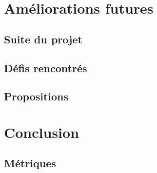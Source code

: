 \documentclass{EPL-master-thesis-covers-FR}
\begin{document}
		

	\chapter{Améliorations futures}


		\section{Suite du projet}
			\label{ref:suite_projet}

		

		\section{Défis rencontrés}

			

		\section{Propositions}

			
	\chapter{Conclusion}

		

		\section{Métriques}
		

	
	
		

	

	\setlength{\parskip}{0em}
	\backcoverpage
\end{document}
